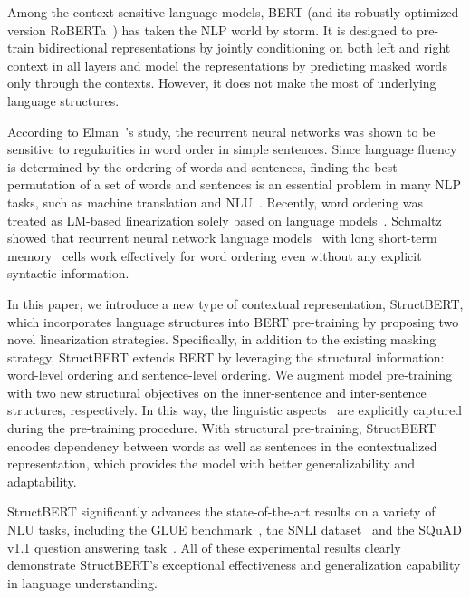 \documentclass{article}
\begin{document}
Among the context-sensitive language models, BERT (and its robustly optimized version RoBERTa~\cite{liu2019roberta}) has taken the NLP world by storm. It is designed to pre-train bidirectional representations by jointly conditioning on both left and right context in all layers and model the representations by predicting masked words only through the contexts. However, it does not make the most of underlying language structures.

According to Elman~\cite{elman1990finding}'s study, the recurrent neural networks was shown to be sensitive to regularities in word order in simple sentences.
Since language fluency is determined by the ordering of words and sentences, finding the best permutation of a set of words and sentences is an essential problem in many NLP tasks, such as machine translation and NLU~\cite{hasler2017comparison}. Recently, word ordering was treated as LM-based linearization solely based on language models~\cite{schmaltz2016word}. Schmaltz showed that recurrent neural network language models~\cite{mikolov2010recurrent} with long short-term memory~\cite{hochreiter1997long} cells work effectively for word ordering even without any explicit syntactic information.

In this paper, we introduce a new type of contextual representation, StructBERT, which incorporates language structures into BERT pre-training by proposing two novel linearization strategies. Specifically, in addition to the existing masking strategy, StructBERT extends BERT by leveraging the structural information: word-level ordering and sentence-level ordering. We augment model pre-training with two new structural objectives on the inner-sentence and inter-sentence structures, respectively.
In this way, the linguistic aspects~\cite{elman1990finding} are explicitly captured during the pre-training procedure. With structural pre-training, StructBERT encodes dependency between words as well as sentences in the contextualized representation, which provides the model with better generalizability and adaptability.

StructBERT significantly advances the state-of-the-art results on a variety of NLU tasks, including the GLUE benchmark~\cite{wang2018glue}, the SNLI dataset~\cite{bowman2015large} and the SQuAD v1.1 question answering task~\cite{rajpurkar2016squad}. All of these experimental results clearly demonstrate StructBERT's exceptional effectiveness and generalization capability in language understanding.
\end{document}
